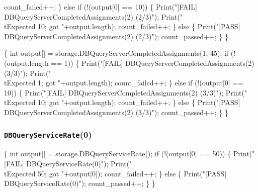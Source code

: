 \documentclass{article}
\def\nwendcode{\endtrivlist \endgroup}
\let\nwdocspar=\par
\theoremstyle{definition}
\begin{document}
    count_failed++;
  \} else if (!(output[0] == 10)) \{
    Print("[FAIL] DBQueryServerCompletedAssignments(2) (2/3)");
    Print("\\tExpected 10; got "+output.length);
    count_failed++;
  \} else \{
    Print("[PASS] DBQueryServerCompletedAssignments(2) (2/3)");
    count_passed++;
  \}
\}
\nwendcode{}\nwdocspar
\nwenddocs{}\endmoddef{}
\{
  int output[] = storage.DBQueryServerCompletedAssignments(1, 45);
  if (!(output.length == 1)) \{
    Print("[FAIL] DBQueryServerCompletedAssignments(2) (3/3)");
    Print("\\tExpected 1; got "+output.length);
    count_failed++;
  \} else if (!(output[0] == 10)) \{
    Print("[FAIL] DBQueryServerCompletedAssignments(2) (3/3)");
    Print("\\tExpected 10; got "+output.length);
    count_failed++;
  \} else \{
    Print("[PASS] DBQueryServerCompletedAssignments(2) (3/3)");
    count_passed++;
  \}
\}
\nwendcode{}\nwdocspar
\subsubsection{{\tt{}DBQueryServiceRate}(0)}
\nwenddocs{}\endmoddef{}
\{
  int output[] = storage.DBQueryServiceRate();
  if (!(output[0] == 50)) \{
    Print("[FAIL] DBQueryServiceRate(0)");
    Print("\\tExpected 50; got "+output[0]);
    count_failed++;
  \} else \{
    Print("[PASS] DBQueryServiceRate(0)");
    count_passed++;
  \}
\}
\nwendcode{}\nwdocspar
\end{document}

